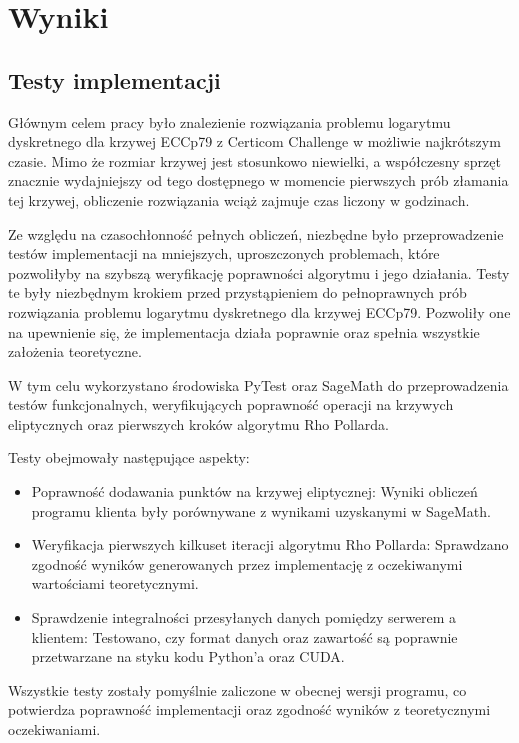 \section{Wyniki}
\subsection{Testy implementacji}

Głównym celem pracy było znalezienie rozwiązania problemu logarytmu dyskretnego
dla krzywej ECCp79 z Certicom Challenge w możliwie najkrótszym czasie. Mimo że
rozmiar krzywej jest stosunkowo niewielki, a współczesny sprzęt znacznie
wydajniejszy od tego dostępnego w momencie pierwszych prób złamania tej krzywej,
obliczenie rozwiązania wciąż zajmuje czas liczony w godzinach.

Ze względu na czasochłonność pełnych obliczeń, niezbędne było przeprowadzenie
testów implementacji na mniejszych, uproszczonych problemach, które pozwoliłyby
na szybszą weryfikację poprawności algorytmu i jego działania. Testy te były
niezbędnym krokiem przed przystąpieniem do pełnoprawnych prób rozwiązania
problemu logarytmu dyskretnego dla krzywej ECCp79. Pozwoliły one na upewnienie się,
że implementacja działa poprawnie oraz spełnia wszystkie założenia teoretyczne.

W tym celu wykorzystano środowiska PyTest oraz SageMath do przeprowadzenia testów
funkcjonalnych, weryfikujących poprawność operacji na krzywych eliptycznych
oraz pierwszych kroków algorytmu Rho Pollarda.

Testy obejmowały następujące aspekty:
\begin{itemize}
    \item Poprawność dodawania punktów na krzywej eliptycznej:
          Wyniki obliczeń programu klienta były porównywane z wynikami uzyskanymi
          w SageMath.
    \item Weryfikacja pierwszych kilkuset iteracji algorytmu Rho Pollarda:
          Sprawdzano zgodność wyników generowanych przez implementację z oczekiwanymi
          wartościami teoretycznymi.
    \item Sprawdzenie integralności przesyłanych danych pomiędzy serwerem a
          klientem: Testowano, czy format danych oraz zawartość są poprawnie przetwarzane
          na styku kodu Python'a oraz CUDA.
\end{itemize}

Wszystkie testy zostały pomyślnie zaliczone w obecnej wersji programu, co
potwierdza poprawność implementacji oraz zgodność wyników z teoretycznymi
oczekiwaniami.

